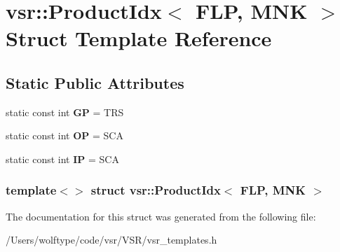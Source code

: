 \hypertarget{structvsr_1_1_product_idx_3_01_f_l_p_00_01_m_n_k_01_4}{\section{vsr\-:\-:Product\-Idx$<$ F\-L\-P, M\-N\-K $>$ Struct Template Reference}
\label{structvsr_1_1_product_idx_3_01_f_l_p_00_01_m_n_k_01_4}
}
\subsection*{Static Public Attributes}
\begin{DoxyCompactItemize}
\item 
\hypertarget{structvsr_1_1_product_idx_3_01_f_l_p_00_01_m_n_k_01_4_aff09a068c3641cb5aa28d626af10c3da}{static const int {\bfseries G\-P} = T\-R\-S}\label{structvsr_1_1_product_idx_3_01_f_l_p_00_01_m_n_k_01_4_aff09a068c3641cb5aa28d626af10c3da}

\item 
\hypertarget{structvsr_1_1_product_idx_3_01_f_l_p_00_01_m_n_k_01_4_a7c63d11baea458d1dad27c016dd38624}{static const int {\bfseries O\-P} = S\-C\-A}\label{structvsr_1_1_product_idx_3_01_f_l_p_00_01_m_n_k_01_4_a7c63d11baea458d1dad27c016dd38624}

\item 
\hypertarget{structvsr_1_1_product_idx_3_01_f_l_p_00_01_m_n_k_01_4_a48d70bd79d8429be1c017afd4bddeec0}{static const int {\bfseries I\-P} = S\-C\-A}\label{structvsr_1_1_product_idx_3_01_f_l_p_00_01_m_n_k_01_4_a48d70bd79d8429be1c017afd4bddeec0}

\end{DoxyCompactItemize}
\subsubsection*{template$<$$>$ struct vsr\-::\-Product\-Idx$<$ F\-L\-P, M\-N\-K $>$}



The documentation for this struct was generated from the following file\-:\begin{DoxyCompactItemize}
\item 
/\-Users/wolftype/code/vsr/\-V\-S\-R/vsr\-\_\-templates.\-h\end{DoxyCompactItemize}
